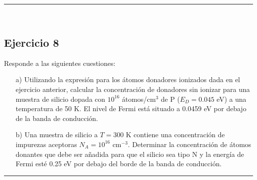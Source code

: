\rule{\textwidth}{0.1pt} \\[2pt]

\subsection{Ejercicio 8}

Responde a las siguientes cuestiones:

\begin{enumerate}
	\item[a)] Utilizando la expresión para los átomos donadores ionizados dada en el ejercicio anterior, calcular la concentración de donadores sin ionizar para una muestra de silicio dopada con $10^{16}$ átomos/cm$^3$ de P ($E_D = 0.045$ eV) a una temperatura de 50 K. El nivel de Fermi está situado a 0.0459 eV por debajo de la banda de conducción.

	\item[b)] Una muestra de silicio a $T = 300$ K contiene una concentración de impurezas aceptoras $N_A = 10^{16}$ cm$^{-3}$. Determinar la concentración de átomos donantes que debe ser añadida para que el silicio sea tipo N y la energía de Fermi esté 0.25 eV por debajo del borde de la banda de conducción.
\end{enumerate}


\rule{\textwidth}{0.1pt} \\[2pt]




